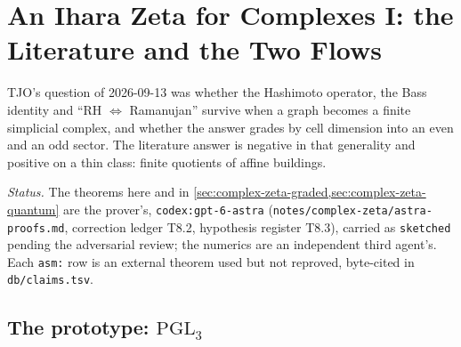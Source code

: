
\section{An Ihara Zeta for Complexes I: the Literature and the Two Flows}
\label{sec:complex-zeta}

TJO's question of 2026-09-13 was whether the Hashimoto operator, the Bass
identity and ``RH $\Leftrightarrow$ Ramanujan'' survive when a graph becomes a
finite simplicial complex, and whether the answer grades by cell dimension into
an even and an odd sector. The literature answer is negative in that generality
and positive on a thin class: finite quotients of affine buildings.

\emph{Status.} The theorems here and in
\cref{sec:complex-zeta-graded,sec:complex-zeta-quantum} are the
prover's, \texttt{codex:gpt-6-astra}
(\texttt{notes/complex-zeta/astra-proofs.md}, correction ledger T8.2, hypothesis
register T8.3), carried as \texttt{sketched} pending the adversarial review; the
numerics are an independent third agent's. Each \texttt{asm:} row is an external
theorem used but not reproved, byte-cited in \texttt{db/claims.tsv}.

\subsection{The prototype: $\mathrm{PGL}_3$}

